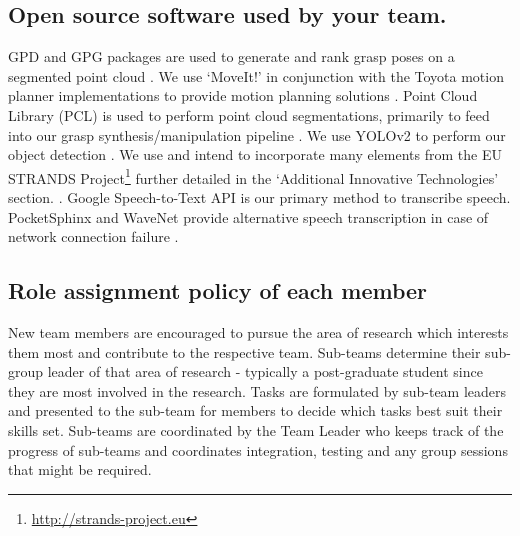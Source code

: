 \documentclass[runningheads,a4paper]{llncs}
\begin{document}
\subsection{Open source software used by your team.}
GPD and GPG packages are used to generate and rank grasp poses on a segmented point cloud \cite{GPD1} \cite{GPD2}. We use `MoveIt!' in conjunction with the Toyota motion planner implementations to provide motion planning solutions \cite{MoveIt1} \cite{MoveIt2}. Point Cloud Library (PCL) is used to perform point cloud segmentations, primarily to feed into our grasp synthesis/manipulation pipeline \cite{PCL}. We use YOLOv2 to perform our object detection \cite{yolo}. We use and intend to incorporate many elements from the EU STRANDS Project\footnote{\url{http://strands-project.eu}} further detailed in the `Additional Innovative Technologies' section. \cite{strands@ram} \cite{dondrup2015tracker} \cite{duckworth_aamas2016}. Google Speech-to-Text API is our primary method to transcribe speech.  PocketSphinx and WaveNet provide alternative speech transcription in case of network connection failure \cite{pocketsphinx} \cite{wavenet}.

\subsection{Role assignment policy of each member}
New team members are encouraged to pursue the area of research which interests them most and contribute to the respective team. Sub-teams determine their sub-group leader of that area of research - typically a post-graduate student since they are most involved in the research. Tasks are formulated by sub-team leaders and presented  to the sub-team for members to decide which tasks best suit their skills set. Sub-teams are coordinated by the Team Leader who keeps track of the progress of sub-teams and coordinates integration, testing and any group sessions that might be required.
\end{document}
